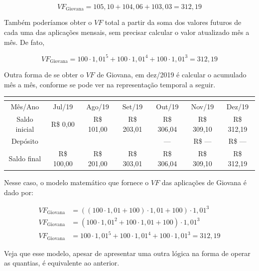 $$\mathit{VF}_{\text{Giovana}}=105{,}10 + 104{,}06 + 103{,}03 = 312{,}19$$

Também poderíamos obter o $\mathit{VF}$ total a partir da soma dos valores futuros de cada uma das aplicações mensais, sem precisar calcular o valor atualizado mês a mês. De fato,

$$\mathit{VF}_{\text{Giovana}}=100\cdot1{,}01^5 + 100\cdot1{,}01^4 + 100\cdot1{,}01^3 = 312{,}19$$

Outra forma de se obter o $\mathit{VF}$ de Giovana, em dez/2019 é calcular o acumulado mês a mês, conforme se pode ver na representação temporal a seguir.

\begin{table}[H]
\centering
\begin{tabu} to \textwidth{|c|c|c|c|c|c|c|}
\hline
{}\\
\hline
Mês/Ano & Jul/19 & Ago/19 & Set/19 & Out/19 & Nov/19 & Dez/19 \\
\hline
Saldo inicial & R\$ 0{,}00 & R\$ 101{,}00 & R\$ 203,01 & R\$ 306,04 & R\$ 309,10 & R\$ 312,19 \\
\hline
Depósito & {} & {} & {} & --- & R\$ --- & R\$ ---\\
\hline
Saldo final & R\$ 100{,}00 & R\$ 201{,}00 & R\$ 303,01 &R\$ 306,04 & R\$ 309,10 & R\$ 312,19 \\
\hline
\end{tabu}
\end{table}

Nesse caso, o modelo matemático que fornece o $\mathit{VF}$ das aplicações de Giovana é dado por:

\begin{align*}
\mathit{VF}_{\text{Giovana}}&=((100\cdot1{,}01+100)\cdot1{,}01+100)\cdot1{,}01^3\\
\mathit{VF}_{\text{Giovana}}&=(100\cdot1{,}01^2+100\cdot1{,}01+100)\cdot1{,}01^3\\
\mathit{VF}_{\text{Giovana}}&=100\cdot1{,}01^5 + 100\cdot1{,}01^4 + 100\cdot1{,}01^3 = 312{,}19
\end{align*}


Veja que esse modelo, apesar de apresentar uma outra lógica na forma de operar as quantias, é equivalente ao anterior. 

